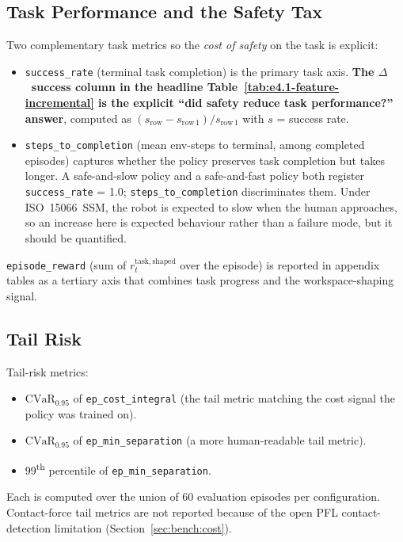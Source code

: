 \documentclass[11pt,a4paper]{report}
\newcommand{\ssm}{SSM}
\newcommand{\pfl}{PFL}
\newcommand{\iso}{ISO~15066}
\newcommand{\cvar}{\ensuremath{\mathrm{CVaR}}}
\begin{document}
\subsection{Task Performance and the Safety Tax}
\label{sec:setup:metrics:task}

Two complementary task metrics so the \emph{cost of safety} on the
task is explicit:

\begin{itemize}[topsep=2pt,itemsep=1pt]
\item \texttt{success\_rate} (terminal task completion) is the
  primary task axis. \textbf{The $\Delta$~success column in the
  headline Table~\ref{tab:e4.1-feature-incremental} is the explicit
  ``did safety reduce task performance?'' answer}, computed as
  $(s_{\mathrm{row}} - s_{\mathrm{row\,1}})/s_{\mathrm{row\,1}}$
  with $s$ = success rate.
\item \texttt{steps\_to\_completion} (mean env-steps to terminal,
  among completed episodes) captures whether the policy preserves
  task completion but takes longer. A safe-and-slow policy and a
  safe-and-fast policy both register \texttt{success\_rate} = 1.0;
  \texttt{steps\_to\_completion} discriminates them. Under
  \iso{}~\ssm{}, the robot is expected to slow when the human
  approaches, so an increase here is expected behaviour rather than
  a failure mode, but it should be quantified.
\end{itemize}

\texttt{episode\_reward} (sum of $r^{\mathrm{task,shaped}}_t$ over
the episode) is reported in appendix tables as a tertiary axis
that combines task progress and the workspace-shaping signal.

\subsection{Tail Risk}
\label{sec:setup:metrics:tail}

Tail-risk metrics:
\begin{itemize}[topsep=2pt,itemsep=1pt]
\item $\cvar_{0.95}$ of \texttt{ep\_cost\_integral} (the tail metric
  matching the cost signal the policy was trained on).
\item $\cvar_{0.95}$ of \texttt{ep\_min\_separation} (a more
  human-readable tail metric).
\item 99\textsuperscript{th} percentile of
  \texttt{ep\_min\_separation}.
\end{itemize}
Each is computed over the union of 60 evaluation episodes per
configuration. Contact-force tail metrics are not reported because
of the open \pfl{} contact-detection limitation
(Section~\ref{sec:bench:cost}).
\end{document}
